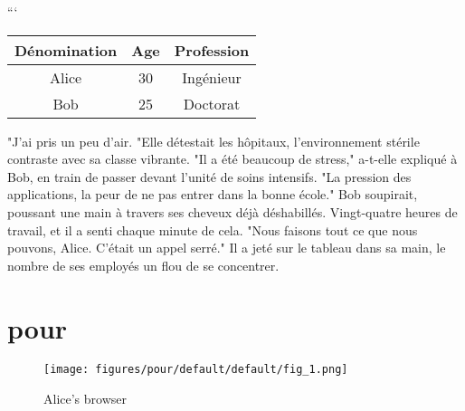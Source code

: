 \documentclass{article}
\begin{document}
```
\begin{tabular}{ccc}
    \hline
    Dénomination & Age & Profession \\
    \hline
    Alice & 30 & Ingénieur \\
    Bob & 25 & Doctorat \\
    \hline
\end{tabular}
"J'ai pris un peu d'air. "Elle détestait les hôpitaux, l'environnement stérile contraste avec sa classe vibrante. "Il a été beaucoup de stress," a-t-elle expliqué à Bob, en train de passer devant l'unité de soins intensifs. "La pression des applications, la peur de ne pas entrer dans la bonne école." Bob soupirait, poussant une main à travers ses cheveux déjà déshabillés. Vingt-quatre heures de travail, et il a senti chaque minute de cela. "Nous faisons tout ce que nous pouvons, Alice. C'était un appel serré." Il a jeté sur le tableau dans sa main, le nombre de ses employés un flou de se concentrer.

\section{pour}


\begin{figure}[h!]
    \centering
    \texttt{[image: figures/pour/default/default/fig\_1.png]}
    \caption{Alice's browser}
    \label{fig:pour_default_1}
\end{figure}
\end{document}
